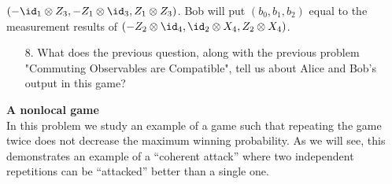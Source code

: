 \begin{exercises}
\mbox{$({-\id_1\otimes Z_3}, {-Z_1 \otimes \id_3}, Z_1\otimes  Z_3)$}. Bob will put $(b_0,b_1,b_2)$ equal to the measurement results of
\mbox{$({-Z_2\otimes \id_4},{\id_2 \otimes X_4},Z_2\otimes X_4)$}.
\begin{enumerate}
\item[8.] What does the previous question, along with the previous problem "Commuting Observables are Compatible", tell us about Alice and Bob's output in this game?
\end{enumerate}

\item {\bf A nonlocal game}\\
In this problem we study an example of a game such that repeating the game twice does not decrease the maximum winning probability. As we will see, this demonstrates an example of a ``coherent attack'' where two independent repetitions can be ``attacked'' better than a single one. 


\end{exercises}

